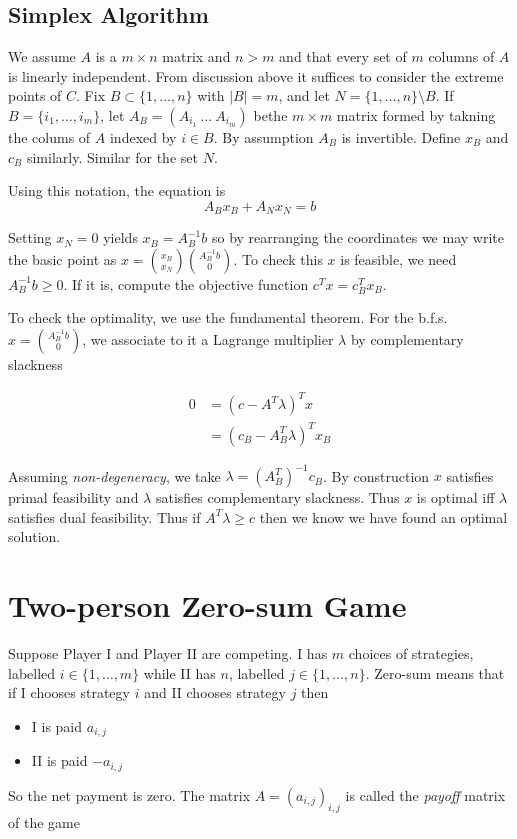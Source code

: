 \documentclass[a4paper]{article}
\begin{document}
\subsection{Simplex Algorithm}

We assume $A$ is a $m\times n$ matrix and $n > m$ and that every set of $m$ columns of $A$ is linearly independent. From discussion above it suffices to consider the extreme points of $C$. Fix $B \subset \{1, \ldots ,n\}$ with $|B|=m$, and let $N=\{1,\ldots, n\} \setminus B$. If $B=\{i_1,\ldots,i_m\}$, let $A_B=(A_{i_1}\:\ldots\:A_{i_m})$ bethe $m\times m$ matrix formed by takning the colums of $A$ indexed by $i \in B$. By assumption $A_B$ is invertible. Define $x_B$ and $c_B$ similarly. Similar for the set $N$.

Using this notation, the equation is
\[
  A_B x_B + A_N x_N = b
\]

Setting $x_N=0$ yields $x_B=A_B^{-1}b$ so by rearranging the coordinates we may write the basic point as $x=\binom{x_B}{x_N}\binom{A_B^{-1}b}{0}$. To check this $x$ is feasible, we need $A_B^{-1}b \geq 0$. If it is, compute the objective function $c^Tx=c_B^Tx_B$.

To check the optimality, we use the fundamental theorem. For the b.f.s. $x=\binom{A_B^{-1}b}{0}$, we associate to it a Lagrange multiplier $\lambda$ by complementary slackness

\begin{align*}
  0 &= (c - A^T\lambda)^Tx \\
    &= (c_B - A_B^T\lambda)^Tx_B
\end{align*}

Assuming \emph{non-degeneracy}, we take $\lambda=(A_B^T)^{-1}c_B$. By construction $x$ satisfies primal feasibility and $\lambda$ satisfies complementary slackness. Thus $x$ is optimal iff $\lambda$ satisfies dual feasibility. Thus if $A^T\lambda\geq c$ then we know we have found an optimal solution.

\section{Two-person Zero-sum Game}

Suppose Player I and Player II are competing. I has $m$ choices of strategies, labelled $i \in \{1,\ldots,m\}$ while II has $n$, labelled $j \in \{1,\ldots,n\}$. Zero-sum means that if I chooses strategy $i$ and II chooses strategy $j$ then

\begin{itemize}
\item I is paid $a_{i,j}$
\item II is paid $-a_{i,j}$
\end{itemize}

So the net payment is zero. The matrix $A=(a_{i,j})_{i,j}$ is called the \emph{payoff} matrix of the game
\end{document}
